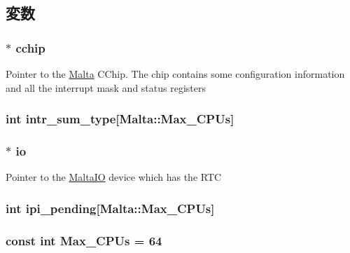 \subsection{変数}
\hypertarget{classMalta_a5d34b1cefc8f42c4e48ca7132a5ff9ce}{
\subsubsection[{cchip}]{$\ast$ {\bf cchip}}}
\label{classMalta_a5d34b1cefc8f42c4e48ca7132a5ff9ce}
Pointer to the \hyperlink{classMalta}{Malta} CChip. The chip contains some configuration information and all the interrupt mask and status registers \hypertarget{classMalta_a8b0ff0114edf7682d27853102d207c45}{
\subsubsection[{intr\_\-sum\_\-type}]{\setlength{\rightskip}{0pt plus 5cm}int {\bf intr\_\-sum\_\-type}\mbox{[}{\bf Malta::Max\_\-CPUs}\mbox{]}}}
\label{classMalta_a8b0ff0114edf7682d27853102d207c45}
\hypertarget{classMalta_aecab915d0de4a8ce102b5d7904f9cb13}{
\subsubsection[{io}]{$\ast$ {\bf io}}}
\label{classMalta_aecab915d0de4a8ce102b5d7904f9cb13}
Pointer to the \hyperlink{classMalta_1_1MaltaIO}{MaltaIO} device which has the RTC \hypertarget{classMalta_abe53041a06886c8b2519264101cabfa5}{
\subsubsection[{ipi\_\-pending}]{\setlength{\rightskip}{0pt plus 5cm}int {\bf ipi\_\-pending}\mbox{[}{\bf Malta::Max\_\-CPUs}\mbox{]}}}
\label{classMalta_abe53041a06886c8b2519264101cabfa5}
\hypertarget{classMalta_ab15ce4af0fe2c47746a30bafa34ced51}{
\subsubsection[{Max\_\-CPUs}]{\setlength{\rightskip}{0pt plus 5cm}const int {\bf Max\_\-CPUs} = 64}}
